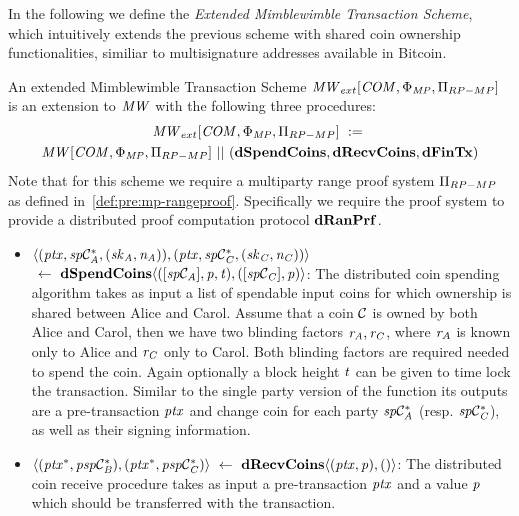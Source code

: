In the following we define the \emph{Extended Mimblewimble Transaction Scheme}, which intuitively extends the previous scheme with shared coin ownership functionalities, similiar to multisignature addresses available in Bitcoin.

\begin{definition}
    \label{def:atom:ext-mw-tx-scheme}
    An extended Mimblewimble Transaction Scheme $\mathit{MW}_{ext}[\mathit{COM},\Phi_{\mathit{MP}},\Pi_{RP-MP}]$ is an extension to $\mathit{MW}$ with the following three procedures:
    \begin{gather*}
        \mathit{MW}_{ext}[\mathit{COM},\Phi_{\mathit{MP}},\Pi_{RP-MP}] ~:=~ \\ \mathit{MW}[\mathit{COM},\Phi_{\mathit{MP}},\Pi_{RP-MP}] ~||~ (\mathbf{dSpendCoins},\mathbf{dRecvCoins}, \mathbf{dFinTx})
    \end{gather*}
    Note that for this scheme we require a multiparty range proof system $\Pi_{RP-MP}$ as defined in~\cref{def:pre:mp-rangeproof}.
    Specifically we require the proof system to provide a distributed proof computation protocol $\mathbf{dRanPrf}$.
    \begin{itemize}
        \item $\langle (\mathit{ptx}, \mathit{sp}\mathcal{C}_{\mathit{A}}^*, (\mathit{sk}_{\mathit{A}},\mathit{\mathit{n}_{\mathit{A}}})), (\mathit{ptx}, \mathit{sp}\mathcal{C}_{\mathit{C}}^*, (\mathit{sk}_{\mathit{C}},\mathit{\mathit{n}_{\mathit{C}}})) \rangle$ \\
        $~\leftarrow~ \mathbf{dSpendCoins} \langle ([\mathit{sp}\mathcal{C}_{\mathit{A}}],\mathit{p},\mathit{t}), ([\mathit{sp}\mathcal{C}_{\mathit{C}}],\mathit{p}) \rangle$:
        The distributed coin spending algorithm takes as input a list of spendable input coins for which ownership is shared between Alice and Carol.
        Assume that a coin $\mathcal{C}$ is owned by both Alice and Carol, then we have two blinding factors $\mathit{r}_{\mathit{A}}, \mathit{r}_{\mathit{C}}$, where $\mathit{r}_{\mathit{A}}$ is known only to Alice and $\mathit{r}_{\mathit{C}}$ only to Carol.
        Both blinding factors are required needed to spend the coin.
        Again optionally a block height $\mathit{t}$ can be given to time lock the transaction.
        Similar to the single party version of the function its outputs are a pre-transaction $\mathit{ptx}$ and change coin for each party $\mathit{sp}\mathcal{C}_{\mathit{A}}^*$ (resp. $\mathit{sp}\mathcal{C}_{\mathit{C}}^*$), as well as their signing information.
        \item $\langle (\mathit{ptx}^*, \mathit{psp}\mathcal{C}_{\mathit{B}}^*), (\mathit{ptx}^*, \mathit{psp}\mathcal{C}_{\mathit{C}}^*) \rangle ~\leftarrow~ \mathbf{dRecvCoins} \langle(\mathit{ptx},\mathit{p}), () \rangle$: The distributed coin receive procedure takes as input a pre-transaction $\mathit{ptx}$ and a value $\mathit{p}$ which should be transferred with the transaction.

\end{itemize}
\end{definition}
